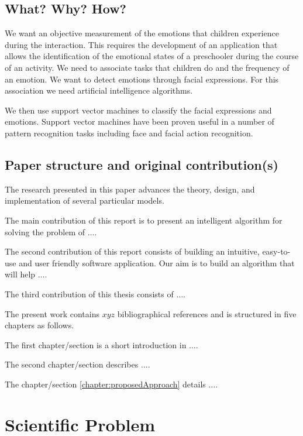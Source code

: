 \documentclass[runningheads,a4paper,11pt]{report}
\begin{document}
\section{What? Why? How?}
\label{section:what}

We want an objective measurement of the emotions that children experience during the interaction. This requires the development of an application that allows the identification of the emotional states of a preschooler during the course of an activity. We need to associate tasks that children do and the frequency of an emotion.
We want to detect emotions through facial expressions. For this association we need artificial intelligence algorithms. 

We then use support vector machines to classify the facial expressions and emotions.
Support vector machines have been proven useful in a number of pattern recognition tasks including face and facial action recognition.

\section{Paper structure and original contribution(s)}
\label{section:structure}

The research presented in this paper advances the theory, design, and implementation of several particular models. 

The main contribution of this report is to present an intelligent algorithm for solving the problem of $\ldots$.

The second contribution of this report consists of building an intuitive, easy-to-use and user
friendly software application. Our aim is to build an algorithm that will help $\ldots$.

The third contribution of this thesis consists of $\ldots$.


The present work contains $xyz$ bibliographical references and is structured in five chapters as follows.

The first chapter/section is a short introduction in $\ldots$.

The second chapter/section describes $\ldots$.

The chapter/section \ref{chapter:proposedApproach} details $\ldots$.



\chapter{Scientific Problem}
\label{section:scientificProblem}
\end{document}
